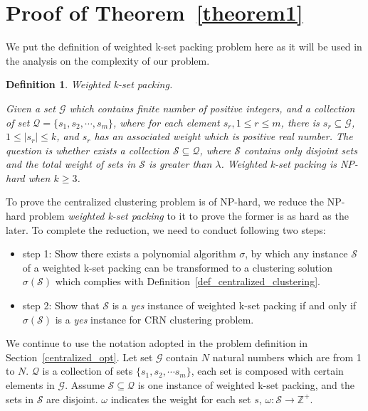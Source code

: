 \documentclass[10pt,journal,compsoc]{IEEEtran}
\makeatletter
\theoremstyle{mytheoremstyle}
\theoremstyle{mytheoremstyle}
\theoremstyle{mytheoremstyle}
\newtheorem{mydef}{Definition}%
\renewenvironment{proof}[1][\proofname]{%
      \par\pushQED{\qed}\fontfamily{ptm}\selectfont%
      \topsep6\p@\@plus6\p@\relax
      \trivlist\item[\hskip\labelsep\bfseries#1\@addpunct{.}]%
      \ignorespaces
    }{%
      \popQED\endtrivlist\@endpefalse
    }
\makeatother
\begin{document}
%
\section*{Proof of Theorem~\ref{theorem1}}
\label{proof_theorem1}
\begin{proof}
We put the definition of weighted k-set packing problem here as it will be used in the analysis on the complexity of our problem.

\begin{mydef}
\label{def_kset_packing}
\textit{Weighted k-set packing.} 

Given a set $\mathcal{G}$ which contains finite number of positive integers, and a collection of set $\mathcal{Q}=\{s_1,s_2,\cdots,s_m\}$, where for each element $s_r, 1\leq r \leq m$, there is $s_r\subseteq \mathcal{G}$, $ 1\leq|s_r| \leq k$, and $s_r$ has an associated weight which is positive real number.
The question is whether exists a collection $\mathcal{S}\subseteq \mathcal{Q}$, where $\mathcal{S}$ contains only disjoint sets and the total weight of sets in $\mathcal{S}$ is greater than $\lambda$.
Weighted k-set packing is NP-hard when $k\geqslant 3$.~\cite{Computers_a_Intractability}
\end{mydef}


To prove the centralized clustering problem is of NP-hard, we reduce the NP-hard problem \textit{weighted k-set packing} to it to prove the former is as hard as the later.
To complete the reduction, we need to conduct following two steps:
\begin{itemize}
\item step 1: Show there exists a polynomial algorithm $\sigma$, by which any instance $\mathcal{S}$ of a weighted k-set packing can be transformed to a clustering solution $\sigma(\mathcal{S})$ which complies with Definition~\ref{def_centralized_clustering}.
\item step 2: Show that $\mathcal{S}$ is a \textit{yes} instance of weighted k-set packing if and only if $\sigma(\mathcal{S})$ is a \textit{yes} instance for CRN clustering problem.
\end{itemize}

We continue to use the notation adopted in the problem definition in Section~\ref{centralized_opt}.
Let set $\mathcal{G}$ contain $N$ natural numbers which are from 1 to $N$.
$\mathcal{Q}$ is a collection of sets $\{s_1, s_2,\cdots s_m\}$, each set is composed with certain elements in $\mathcal{G}$.
Assume $\mathcal{S}\subseteq \mathcal{Q}$ is one instance of weighted k-set packing, and the sets in $\mathcal{S}$ are disjoint.
$\omega$ indicates the weight for each set $s$, $\omega:\mathcal{S}\rightarrow \mathbb{Z}^{+}$.




\end{proof}
\end{document}
